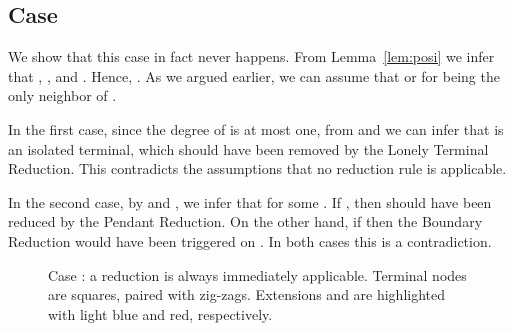 \subsection{Case }

We show that this case in fact never happens. From Lemma~\ref{lem:posi} we infer that , , and . Hence, . As we argued earlier, we can assume that  or  for  being the only neighbor of . 

In the first case, since the degree of  is at most one, from  and  we can infer that  is an isolated terminal, which should have been removed by the Lonely Terminal Reduction. This contradicts the assumptions that no reduction rule is applicable.

In the second case, by  and , we infer that  for some . If , then  should have been reduced by the Pendant Reduction. On the other hand, if  then the Boundary Reduction would have been triggered on . In both cases this is a contradiction.

\begin{figure}[H]
	\centering
	\clearpage{}
\figspace
\clearpage{}
	\caption{Case  : a reduction is always immediately applicable. Terminal nodes are squares, paired with zig-zags. Extensions  and  are highlighted with light blue and red, respectively.}
\label{fig:case-00}
\end{figure}



